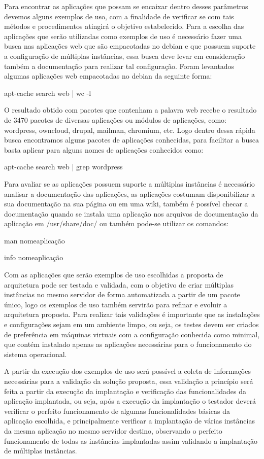 Para encontrar as aplicações que possam se encaixar dentro desses parâmetros devemos
alguns exemplos de uso, com a finalidade de verificar se com tais métodos e
procedimentos atingirá o objetivo estabelecido. Para a escolha das aplicações que
serão utilizadas como exemplos de uso é necessário fazer uma busca nas aplicações
web que são empacotadas no debian e que possuem suporte a configuração de múltiplas
instâncias, essa busca deve levar em consideração também a documentação para realizar
tal configuração. Foram levantados algumas aplicações web empacotadas no debian da
seguinte forma:

\begin{center}
apt-cache search web | wc -l
\end{center}

O resultado obtido com pacotes que contenham a palavra web recebe o resultado de 3470
pacotes de diversas aplicações ou módulos de aplicações, como:
wordpress, owncloud, drupal, mailman, chromium, etc. Logo dentro dessa rápida busca
encontramos alguns pacotes de aplicações conhecidas, para facilitar a busca basta
aplicar para alguns nomes de aplicações conhecidos como:

\begin{center}
apt-cache search web | grep wordpress
\end{center}

Para avaliar se as aplicações possuem suporte a múltiplas instâncias é necessário
analisar a documentação das aplicações, as aplicações costumam disponibilizar a sua
documentação na sua página ou em uma wiki, também é possível checar a documentação
quando se instala uma aplicação nos arquivos de documentação da aplicação em
/usr/share/doc/ ou também pode-se utilizar os comandos:

\begin{center}
man nomeaplicação

info nomeaplicação
\end{center}

Com as aplicações que serão exemplos de uso escolhidas a proposta de arquitetura
pode ser testada e validada, com o objetivo de criar múltiplas instâncias
no mesmo servidor de forma automatizada a partir de um pacote único, logo os
exemplos de uso também servirão para refinar e evoluir a arquitetura proposta.
Para realizar tais validações é importante que as instalações e configurações
sejam em um ambiente limpo, ou seja, os testes devem ser criados de preferência
em máquinas virtuais com a configuração conhecida como minimal, que contém
instalado apenas as aplicações necessárias para o funcionamento do sistema operacional.

A partir da execução dos exemplos de uso será possível a coleta de informações
necessárias para a validação da solução proposta, essa validação a princípio
será feita a partir da execução da implantação e verificação das funcionalidades
da aplicação implantada, ou seja, após a execução da implantação o testador deverá
verificar o perfeito funcionamento de algumas funcionalidades básicas da aplicação
escolhida, e principalmente verificar a implantação de várias instâncias da mesma
aplicação no mesmo servidor destino, observando o perfeito funcionamento de todas as
instâncias implantadas assim validando a implantação de múltiplas instâncias.
